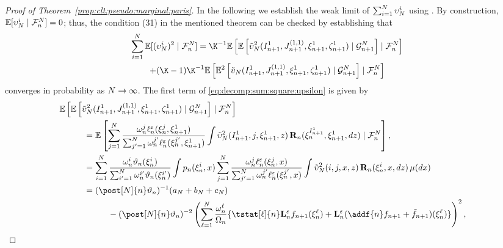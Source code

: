 \begin{proof}[Proof of Theorem~\ref{prop:clt:pseudo:marginal:paris}]
In the following we establish the weak limit of $\sum_{i = 1}^N \upsilon^i_N$ using \cite[Theorem~A.3]{douc:moulines:2008}. By construction, $\mathbb{E}[\upsilon^i_N \mid \mathcal{F}_{n}^{N}] = 0$; thus, the condition (31) in the mentioned theorem can be checked by establishing that 
\begin{multline}
\label{eq:decomp:sum:square:upsilon}
\sum_{i = 1}^\N \pE[(\upsilon^i_\N)^2 \mid \calF{n}{\N}] = \K^{-1} \pE \left[  \pE \left[ \tilde{\upsilon}_\N^2(I_{n + 1}^1, J_{n + 1}^{(1,1)}, \epart{n + 1}{1}, \zpart{n + 1}{1}) \mid \calG{n + 1}{\N} \right] \mid \calF{n}{\N} \right] \\
 + (\K - 1) \K^{-1} \pE \left[ \pE^2 \left[ \tilde{\upsilon}_\N(I_{n + 1}^1, J_{n + 1}^{(1,1)}, \epart{n + 1}{1}, \zpart{n + 1}{1}) \mid \calG{n + 1}{\N} \right] \mid \calF{n}{\N} \right] 
\end{multline}
converges in probability as $N \to \infty$. The first term of \eqref{eq:decomp:sum:square:upsilon} is given by
\begin{align}
\lefteqn{\pE\left[ \pE\left[ \tilde{\upsilon}^2_\N(I_{n + 1}^1,J_{n + 1}^{(1,1)}, \epart{n + 1}{1}, \zpart{n + 1}{1}) \cond \calG{n + 1}{\N} \right] \cond \calF{n}{\N}\right]} \hspace{10mm} \nonumber \\
&= \pE\left[\sum_{j = 1}^\N \frac{\ewght{n}{j} \udmod{n} (\epart{n}{j}, \epart{n + 1}{1})}{\sum_{j' = 1}^\N \ewght{n}{j'} \udmod{n} (\epart{n}{j'}, \epart{n + 1}{1})} \int \tilde{\upsilon}^2_N(I_{n + 1}^1, j, \epart{n + 1}{1}, z) \, \ukdist{n}(\epart{n}{\ind{n + 1}{1}}, \epart{n + 1}{1}, \rmd z) \cond \calF{n}{\N} \right], \nonumber \\
&= \sum_{i = 1}^\N \frac{\ewght{n}{i} \adjfuncforward{n}(\epart{n}{i})}{\sum_{i' = 1}^\N \ewght{n}{i'} \adjfuncforward{n}(\epart{n}{i'})} \int \kissforward{n}{n}(\epart{n}{i}, x)
\sum_{j = 1}^\N \frac{\ewght{n}{j} \udmod{n} (\epart{n}{j}, x)}{\sum_{j' = 1}^{\N} \ewght{n}{j'} \udmod{n} (\epart{n}{j'}, x)} \int \tilde{\upsilon}^2_\N(i, j,x, z) \, \ukdist{n}(\epart{n}{i}, x, \rmd z) \, \mu(\rmd x) \nonumber \\
&= (\post[\N]{n} \adjfuncforward{n})^{-1} (a_\N + b_\N + c_\N) \nonumber \\
&\hspace{10mm} - (\post[\N]{n} \adjfuncforward{n})^{-2} \left(\sum_{\ell=1}^\N \frac{\ewght{n}{\ell}}{\sumwght{n}} \{ \tstat[\ell]{n} \ukmod{n} f_{n + 1}(\epart{n}{\ell}) + \ukmod{n}(\addf{n} f_{n + 1} + \ftd{n + 1})(\epart{n}{\ell}) \} \right)^2, \label{eq:upsilon:2:decomp} 

\end{align}
\end{proof}
